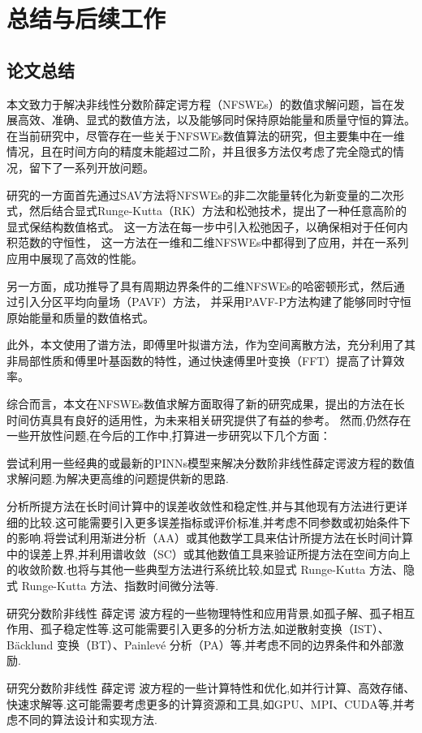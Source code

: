 
\chapter[总结与后续工作]{总结与后续工作}
\section{论文总结}

本文致力于解决非线性分数阶薛定谔方程（NFSWEs）的数值求解问题，旨在发展高效、准确、显式的数值方法，以及能够同时保持原始能量和质量守恒的算法。在当前研究中，尽管存在一些关于NFSWEs数值算法的研究，但主要集中在一维情况，且在时间方向的精度未能超过二阶，并且很多方法仅考虑了完全隐式的情况，留下了一系列开放问题。

研究的一方面首先通过SAV方法将NFSWEs的非二次能量转化为新变量的二次形式，然后结合显式Runge-Kutta（RK）方法和松弛技术，提出了一种任意高阶的显式保结构数值格式。
这一方法在每一步中引入松弛因子，以确保相对于任何内积范数的守恒性，
这一方法在一维和二维NFSWEs中都得到了应用，并在一系列应用中展现了高效的性能。

另一方面，成功推导了具有周期边界条件的二维NFSWEs的哈密顿形式，然后通过引入分区平均向量场（PAVF）方法，
并采用PAVF-P方法构建了能够同时守恒原始能量和质量的数值格式。

此外，本文使用了谱方法，即傅里叶拟谱方法，作为空间离散方法，充分利用了其非局部性质和傅里叶基函数的特性，通过快速傅里叶变换（FFT）提高了计算效率。

综合而言，本文在NFSWEs数值求解方面取得了新的研究成果，提出的方法在长时间仿真具有良好的适用性，为未来相关研究提供了有益的参考。
然而,仍然存在一些开放性问题,在今后的工作中,打算进一步研究以下几个方面：

尝试利用一些经典的或最新的PINNs模型来解决分数阶非线性薛定谔波方程的数值求解问题.为解决更高维的问题提供新的思路.

分析所提方法在长时间计算中的误差收敛性和稳定性,并与其他现有方法进行更详细的比较.这可能需要引入更多误差指标或评价标准,并考虑不同参数或初始条件下的影响.将尝试利用渐进分析（AA）或其他数学工具来估计所提方法在长时间计算中的误差上界,并利用谱收敛（SC）或其他数值工具来验证所提方法在空间方向上的收敛阶数.也将与其他一些典型方法进行系统比较,如显式 Runge-Kutta 方法、隐式 Runge-Kutta 方法、指数时间微分法等.

研究分数阶非线性 薛定谔 波方程的一些物理特性和应用背景,如孤子解、孤子相互作用、孤子稳定性等.这可能需要引入更多的分析方法,如逆散射变换（IST）、Bäcklund 变换（BT）、Painlevé 分析（PA）等,并考虑不同的边界条件和外部激励.

研究分数阶非线性 薛定谔 波方程的一些计算特性和优化,如并行计算、高效存储、快速求解等.这可能需要考虑更多的计算资源和工具,如GPU、MPI、CUDA等,并考虑不同的算法设计和实现方法.